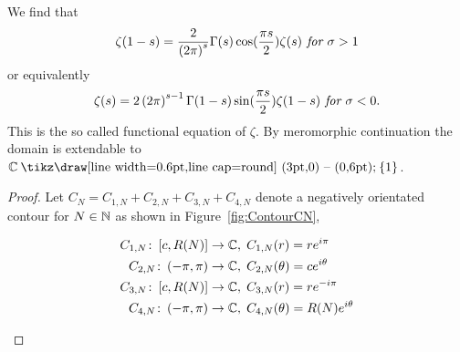 \begin{theorem}
	We find that
\begin{equation}
	\zeta(1 - s) = \frac{2}{\left(2 \pi\right)^s} \Gamma(s) \cos(\frac{\pi s}{2}) \zeta(s) \textit{ for } \sigma > 1
\end{equation}
	or equivalently
\begin{equation}
	\zeta(s) = 2\left(2 \pi\right)^{s - 1} \Gamma(1 - s) \sin(\frac{\pi s}{2}) \zeta(1 - s) \textit{ for } \sigma < 0.
\end{equation}
	This is the so called functional equation of $\zeta$. By meromorphic continuation the domain is extendable to $\field{C} \mysetminus \fbr{1}$.
\end{theorem}
\begin{proof}
	Let $C_N = C_{1,N} + C_{2,N} + C_{3,N} + C_{4,N}$ denote a negatively orientated contour for $N \in \mathbb{N}$ as shown in Figure~\ref{fig:ContourCN},
\begin{figure}[!htb]
\begin{minipage}[c]{0.55\textwidth}
\centering
\begin{equation*}
\begin{aligned}
	C_{1,N} \colon \left[c, R(N)\right] &\to \mathbb{C}, \; C_{1,N}(r) = r e^{i \pi} \\
	C_{2,N} \colon \left(-\pi, \pi\right) &\to \mathbb{C}, \; C_{2,N}(\theta) = c e^{i \theta} \\
	C_{3,N} \colon \left[c, R(N)\right] &\to \mathbb{C}, \; C_{3,N}(r) = r e^{-i \pi} \\
	C_{4,N} \colon \left(-\pi, \pi\right) &\to \mathbb{C}, \; C_{4,N}(\theta) = R(N) e^{i \theta}
\end{aligned}
\end{equation*}
\end{minipage}
\begin{minipage}[c]{0.45\textwidth}
\raggedleft
{}
\end{minipage}
\end{figure}
\end{proof}
